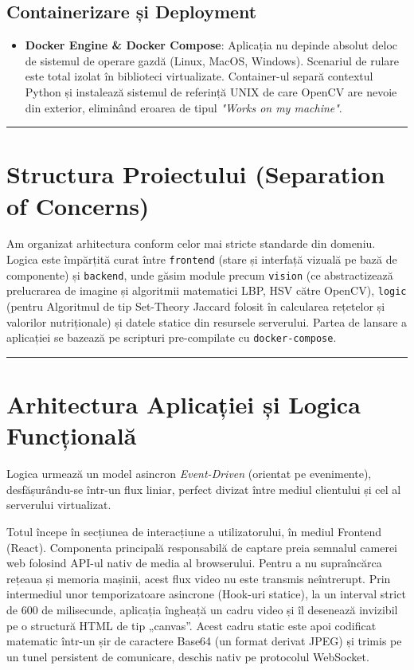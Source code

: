\documentclass[12pt,a4paper]{article}
\begin{document}
\subsection{Containerizare și Deployment}
\begin{itemize}
    \item \textbf{Docker Engine \& Docker Compose}: Aplicația nu depinde absolut deloc de sistemul de operare gazdă (Linux, MacOS, Windows). Scenariul de rulare este total izolat în biblioteci virtualizate. Container-ul separă contextul Python și instalează sistemul de referință UNIX de care OpenCV are nevoie din exterior, eliminând eroarea de tipul \textit{"Works on my machine"}.
\end{itemize}

\vspace{0.5cm}
\hrule
\vspace{0.5cm}

\section{Structura Proiectului (Separation of Concerns)}

Am organizat arhitectura conform celor mai stricte standarde din domeniu. Logica este împărțită curat între \texttt{frontend} (stare și interfață vizuală pe bază de componente) și \texttt{backend}, unde găsim module precum \texttt{vision} (ce abstractizează prelucrarea de imagine și algoritmii matematici LBP, HSV către OpenCV), \texttt{logic} (pentru Algoritmul de tip Set-Theory Jaccard folosit în calcularea rețetelor și valorilor nutriționale) și datele statice din resursele serverului. Partea de lansare a aplicației se bazează pe scripturi pre-compilate cu \texttt{docker-compose}.

\vspace{0.5cm}
\hrule
\vspace{0.5cm}

\section{Arhitectura Aplicației și Logica Funcțională}

Logica urmează un model asincron \textit{Event-Driven} (orientat pe evenimente), desfășurându-se într-un flux liniar, perfect divizat între mediul clientului și cel al serverului virtualizat.

Totul începe în secțiunea de interacțiune a utilizatorului, în mediul Frontend (React). Componenta principală responsabilă de captare preia semnalul camerei web folosind API-ul nativ de media al browserului. Pentru a nu supraîncărca rețeaua și memoria mașinii, acest flux video nu este transmis neîntrerupt. Prin intermediul unor temporizatoare asincrone (Hook-uri statice), la un interval strict de 600 de milisecunde, aplicația îngheață un cadru video și îl desenează invizibil pe o structură HTML de tip „canvas”. Acest cadru static este apoi codificat matematic într-un șir de caractere Base64 (un format derivat JPEG) și trimis pe un tunel persistent de comunicare, deschis nativ pe protocolul WebSocket.
\end{document}
